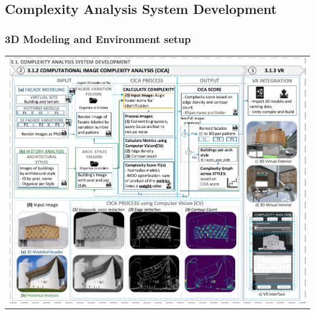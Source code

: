 \begin{linenumbers}
\subsection{Complexity Analysis System Development}
\label{subsec:ComplexitySystemDevelopment}




\subsubsection{3D Modeling and Environment setup}
\label{subsubsec:3DModeling}


\begin{table}[!htb]
\centering
\small
\begin{tabular}{c}
\begin{minipage}{\textwidth}
\centering
\includegraphics[width= \linewidth]{Images/CICA_and_VR_flowchart}

\end{minipage}
\end{tabular}
\end{table}
\end{linenumbers}
